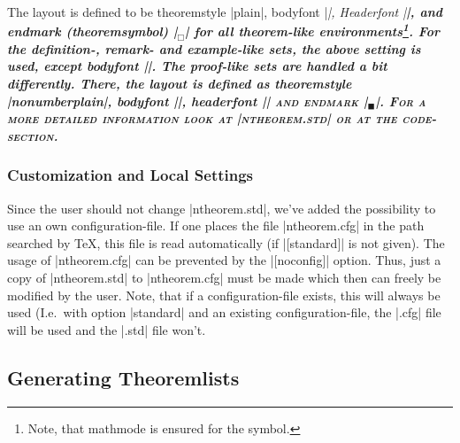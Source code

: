 \documentclass[11pt,oneside]{ltxdoc}
\theoremstyle{marginbreak}
\theoremstyle{changebreak}
\theoremstyle{change}
\theoremstyle{plain}
\theoremstyle{nonumberplain}
\begin{document}
The layout is defined to be theoremstyle |plain|, bodyfont |\itshape|,
Headerfont |\bfseries|, and endmark (theoremsymbol)
|\ensuremath{_\Box}| for all theorem-like environments\footnote{Note, 
that mathmode is ensured for the symbol.}.
For the definition-, remark- and example-like sets,
the above setting is used, except bodyfont |\upshape|.
The proof-like sets are handled a bit differently. There, the layout 
is defined as theoremstyle |nonumberplain|, bodyfont |\upshape|,
headerfont |\scshape| and endmark |\ensuremath{_\blacksquare}|. 
For a more detailed information look at 
|ntheorem.std| or at the code-section.

\subsubsection{Customization and Local Settings}

Since the user should not change |ntheorem.std|,
we've added the possibility to use an own configuration-file.
If one places the file |ntheorem.cfg| in the path searched by
\TeX, this file is read automatically (if |[standard]|
is not given). The usage of |ntheorem.cfg| can be prevented by the
|[noconfig]| option. Thus, just
a copy of |ntheorem.std| to |ntheorem.cfg| must be made
which then can freely be modified by the user. Note, that if a 
configuration-file exists, this will always be used (I.e.\ with 
option |standard| and an existing configuration-file, the |.cfg| 
file will be used and the |.std| file won't.

\subsection{Generating Theoremlists}\label{sec:thmlists}
\end{document}
